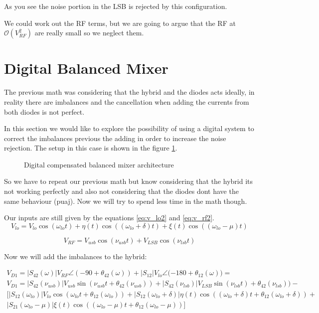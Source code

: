 As you see the noise portion in the LSB is rejected by this configuration.
\vspace{0.5cm}

We could work out the RF terms, but we are going to argue that the RF at $\mathcal{O}(V_{RF}^2)$ are really small so we neglect them. 


\section{Digital Balanced Mixer}
The previous math was considering that the hybrid and the diodes acts ideally, in reality there are imbalances and the cancellation when adding the currents from both diodes is not perfect.


In this section we would like to explore the possibility of using a digital system to correct the imbalances previous the adding in order to increase the noise rejection. The setup in this case is shown in the figure \ref{fig:bm_roach}.

\begin{figure}[t]
    \centering
    
    \caption{Digital compensated balanced mixer architecture}
    \label{fig:bm_roach}
\end{figure}


So we have to repeat our previous math but know considering that the hybrid its not working perfectly and also not considering that the diodes dont have the same behaviour (puaj). Now we will try to spend less time in the math though.

Our inputs are still given by the equations \ref{eq:v_lo2} and \ref{eq:v_rf2}. 
\begin{equation}
    \label{eq:v_lo2}
    V_{lo} = V_{lo}\cos(\omega_{lo}t)+\eta(t)\cos((\omega_{lo}+\delta)t)+\xi(t)\cos((\omega_{lo}-\mu)t)
\end{equation}

\begin{equation}
    \label{eq:v_rf2}
    V_{RF} = V_{usb}\cos(\nu_{usb}t)+V_{LSB}\cos(\nu_{lsb}t)
\end{equation}

Now we will add the imbalances to the hybrid:

\begin{equation}
    \label{eq:d1_2}
    \begin{gathered}
    V_{D1}=|S_{42}(\omega)|V_{RF}\angle{(-90+\theta_{42}(\omega))}+|S_{12}|V_{lo}\angle{(-180+\theta_{12}(\omega)})= \\
    V_{D1}=  |S_{42}(\nu_{usb})|V_{usb}\sin(\nu_{usb}t+\theta_{42}(\nu_{usb}))+|S_{42}(\nu_{lsb})|V_{LSB}\sin(\nu_{lsb}t)+\theta_{42}(\nu_{lsb}))-\\ \big[|S_{12}(\omega_{lo})|V_{lo}\cos(\omega_{lo}t+\theta_{12}(\omega_{lo}))+ |S_{12}(\omega_{lo}+\delta)|\eta(t)\cos((\omega_{lo}+\delta)t+\theta_{12}(\omega_{lo}+\delta))+\\|S_{21}(\omega_{lo}-\mu)|\xi(t)\cos((\omega_{lo}-\mu)t+\theta_{12}(\omega_{lo}-\mu)) \big]
    \end{gathered}
\end{equation}
\vspace{1cm}


